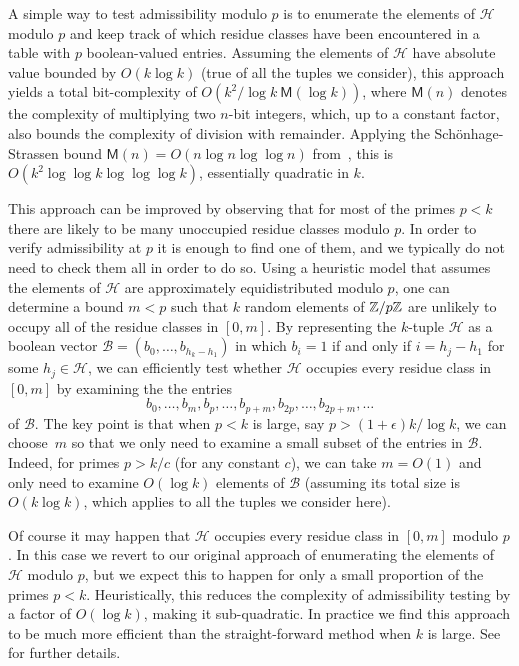 A simple way to test admissibility modulo $p$ is to  enumerate the elements of $\mathcal{H}$ modulo $p$ and keep track of which residue classes have been encountered in a table with $p$ boolean-valued entries.
Assuming the elements of $\mathcal{H}$ have absolute value bounded by $O(k\log k)$ (true of all the tuples we consider), this approach yields a total bit-complexity of $O(k^2/\log k\ \textsf{M}(\log k))$, where $\textsf{M}(n)$ denotes the complexity of multiplying two $n$-bit integers, which, up to a constant factor, also bounds the complexity of division with remainder.
Applying the Sch\"onhage-Strassen bound $\textsf{M}(n)=O(n\log n\log\log n)$ from~\cite{schonhage}, this is $O(k^2\log\log k\log\log\log k)$, essentially quadratic in $k$.

This approach can be improved by observing that for most of the primes $p < k$ there are likely to be many unoccupied residue classes modulo $p$.  In order to verify admissibility at $p$ it is enough to find one of them, and we typically do not need to check them all in order to do so.  Using a heuristic model that assumes the elements of $\mathcal{H}$ are approximately equidistributed modulo $p$, one can determine a bound $m < p$ such that $k$ random elements of $\mathbb{Z}/p\mathbb{Z}$ are unlikely to occupy all of the residue classes in $[0,m]$.  By representing the $k$-tuple $\mathcal{H}$ as a boolean vector $\mathcal{B}=(b_0,\ldots,b_{h_k-h_1})$ in which $b_i=1$ if and only if $i=h_j-h_1$ for some $h_j\in \mathcal{H}$, we can efficiently test whether $\mathcal{H}$ occupies every residue class in $[0,m]$ by examining the the entries
\[
b_0,\ldots,b_m,b_p,\ldots,b_{p+m},b_{2p},\ldots,b_{2p+m},\ldots
\]
of $\mathcal{B}$.
The key point is that when $p<k$ is large, say $p > (1+\epsilon)k/\log k$, we can choose~$m$ so that we only need to examine a small subset of the entries in $\mathcal{B}$.
Indeed, for primes $p > k/c$ (for any constant $c$), we can take $m=O(1)$ and only need to examine $O(\log k)$ elements of $\mathcal{B}$ (assuming its total size is $O(k\log k)$, which applies to all the tuples we consider here).

Of course it may happen that $\mathcal{H}$ occupies every residue class in $[0,m]$ modulo $p$.
In this case we revert to our original approach of enumerating the elements of $\mathcal{H}$ modulo $p$, but we expect this to happen for only a small proportion of the primes $p < k$.
Heuristically, this reduces the complexity of admissibility testing by a factor of $O(\log k)$, making it sub-quadratic.  In practice we find this approach to be much more efficient than the straight-forward method when $k$ is large.  See \cite[\S 3.1]{polymath8a} for further details.

